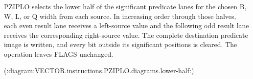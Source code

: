 PZIPLO selects the lower half of the significant predicate lanes for the chosen B, W, L, or Q width from each source.
In increasing order through those halves, each even result lane receives a left-source value and the following odd result lane receives the corresponding right-source value.
The complete destination predicate image is written, and every bit outside its significant positions is cleared.
The operation leaves FLAGS unchanged.

(:diagram:VECTOR.instructions.PZIPLO.diagrams.lower-half:)
